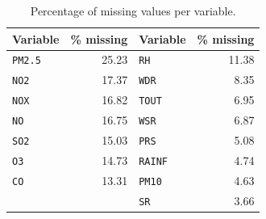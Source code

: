 \begin{table}[pos=t]
  \centering
  \caption{Percentage of missing values per variable.}
  \label{tab:dic-faltantes}
  \small
  \begin{tabular}{lr@{\qquad}lr}
    \toprule
    Variable & \% missing & Variable & \% missing \\
    \midrule
    \texttt{PM2.5} & 25.23 & \texttt{RH}    & 11.38 \\
    \texttt{NO2}   & 17.37 & \texttt{WDR}   & 8.35  \\
    \texttt{NOX}   & 16.82 & \texttt{TOUT}  & 6.95  \\
    \texttt{NO}    & 16.75 & \texttt{WSR}   & 6.87  \\
    \texttt{SO2}   & 15.03 & \texttt{PRS}   & 5.08  \\
    \texttt{O3}    & 14.73 & \texttt{RAINF} & 4.74  \\
    \texttt{CO}    & 13.31 & \texttt{PM10}  & 4.63  \\
                   &       & \texttt{SR}    & 3.66  \\
    \bottomrule
  \end{tabular}
\end{table}

